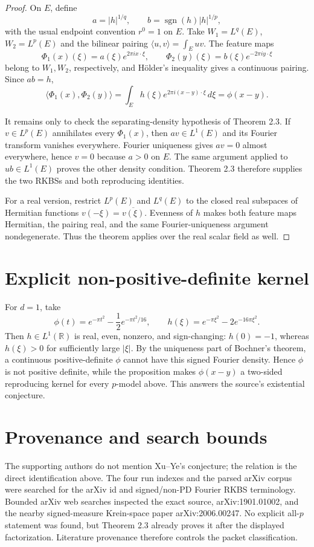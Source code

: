 \documentclass[11pt]{article}
\newcommand{\R}{\mathbb R}
\newcommand{\sgn}{\operatorname{sgn}}
\begin{document}
\begin{proof}
On $E$, define
\[
 a=|h|^{1/q},\qquad b=\sgn(h)|h|^{1/p},
\]
with the usual endpoint convention $r^0=1$ on $E$.  Take
$W_1=L^q(E)$, $W_2=L^p(E)$ and the bilinear pairing
$\langle u,v\rangle=\int_Euv$.  The feature maps
\[
 \Phi_1(x)(\xi)=a(\xi)e^{2\pi i x\cdot\xi},\qquad
 \Phi_2(y)(\xi)=b(\xi)e^{-2\pi i y\cdot\xi}
\]
belong to $W_1,W_2$, respectively, and H\"older's inequality gives a
continuous pairing.  Since $ab=h$,
\[
 \langle\Phi_1(x),\Phi_2(y)\rangle
 =\int_Eh(\xi)e^{2\pi i(x-y)\cdot\xi}\,d\xi
 =\phi(x-y).
\]

It remains only to check the separating-density hypothesis of Theorem 2.3.
If $v\in L^p(E)$ annihilates every $\Phi_1(x)$, then $av\in L^1(E)$ and
its Fourier transform vanishes everywhere.  Fourier uniqueness gives
$av=0$ almost everywhere, hence $v=0$ because $a>0$ on $E$.  The same
argument applied to $ub\in L^1(E)$ proves the other density condition.
Theorem 2.3 therefore supplies the two RKBSs and both reproducing identities.

For a real version, restrict $L^p(E)$ and $L^q(E)$ to the closed real
subspaces of Hermitian functions $v(-\xi)=\overline{v(\xi)}$.  Evenness of
$h$ makes both feature maps Hermitian, the pairing real, and the same
Fourier-uniqueness argument nondegenerate.  Thus the theorem applies over the
real scalar field as well.
\end{proof}

\section{Explicit non-positive-definite kernel}

For $d=1$, take
\[
 \phi(t)=e^{-\pi t^2}-\frac12e^{-\pi t^2/16},\qquad
 h(\xi)=e^{-\pi\xi^2}-2e^{-16\pi\xi^2}.
\]
Then $h\in L^1(\R)$ is real, even, nonzero, and sign-changing: $h(0)=-1$,
whereas $h(\xi)>0$ for sufficiently large $|\xi|$.  By the uniqueness part
of Bochner's theorem, a continuous positive-definite $\phi$ cannot have this
signed Fourier density.  Hence $\phi$ is not positive definite, while the
proposition makes $\phi(x-y)$ a two-sided reproducing kernel for every
$p$-model above.  This answers the source's existential conjecture.

\section{Provenance and search bounds}

The supporting authors do not mention Xu--Ye's conjecture; the relation is the
direct identification above.  The four run indexes and the parsed arXiv corpus
were searched for the arXiv id and signed/non-PD Fourier RKBS terminology.
Bounded arXiv web searches inspected the exact source, arXiv:1901.01002, and
the nearby signed-measure Krein-space paper arXiv:2006.00247.  No explicit
all-$p$ statement was found, but Theorem 2.3 already proves it after the
displayed factorization.  Literature provenance therefore controls the packet
classification.
\end{document}
